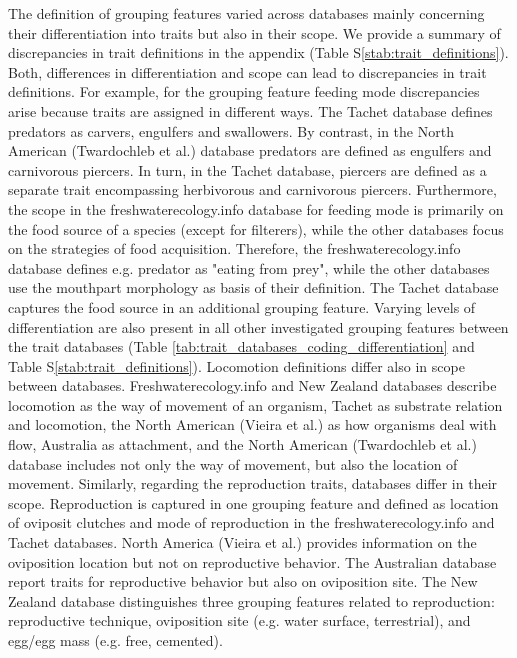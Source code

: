 \documentclass{article}
\begin{document}
The definition of grouping features varied across databases mainly concerning their differentiation into traits but also in their scope. We provide a summary of discrepancies in trait definitions in the appendix (Table S\ref{stab:trait_definitions}). Both, differences in differentiation and scope can lead to discrepancies in trait definitions. For example, for the grouping feature feeding mode discrepancies arise because traits are assigned in different ways. The Tachet database defines predators as carvers, engulfers and swallowers. By contrast, in the North American (Twardochleb et al.) database predators are defined as engulfers and carnivorous piercers. In turn, in the Tachet database, piercers are defined as a separate trait encompassing herbivorous and carnivorous piercers. Furthermore, the scope in the freshwaterecology.info database for feeding mode is primarily on the food source of a species (except for filterers), while the other databases focus on the strategies of food acquisition. Therefore, the freshwaterecology.info database defines e.g. predator as "eating from prey", while the other databases use the mouthpart morphology as basis of their definition. The Tachet database captures the food source in an additional grouping feature. Varying levels of differentiation are also present in all other investigated grouping features between the trait databases (Table \ref{tab:trait_databases_coding_differentiation} and Table S\ref{stab:trait_definitions}). Locomotion definitions differ also in scope between databases. Freshwaterecology.info and New Zealand databases describe locomotion as the way of movement of an organism, Tachet as substrate relation and locomotion, the North American (Vieira et al.) as how organisms deal with flow, Australia as attachment, and the North American (Twardochleb et al.) database includes not only the way of movement, but also the location of movement. Similarly, regarding the reproduction traits, databases differ in their scope. Reproduction is captured in one grouping feature and defined as location of oviposit clutches and mode of reproduction in the freshwaterecology.info and Tachet databases. North America (Vieira et al.) provides information on the oviposition location but not on reproductive behavior. The Australian database report traits for reproductive behavior but also on oviposition site. The New Zealand database distinguishes three grouping features related to reproduction: reproductive technique, oviposition site (e.g. water surface, terrestrial), and egg/egg mass (e.g. free, cemented).
\end{document}
